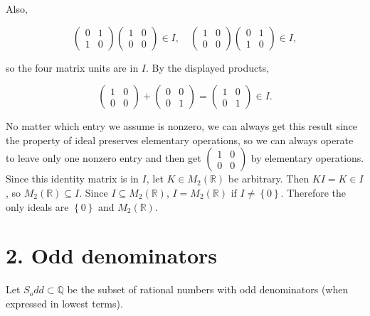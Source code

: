 Also,

\[\begin{pmatrix}
0 & 1 \\
1 & 0
\end{pmatrix}\begin{pmatrix}
1 & 0 \\
0 & 0
\end{pmatrix} \in I,\quad\begin{pmatrix}
1 & 0 \\
0 & 0
\end{pmatrix}\begin{pmatrix}
0 & 1 \\
1 & 0
\end{pmatrix} \in I,\]

so the four matrix units are in \(I\). By the displayed products,

\[\begin{pmatrix}
1 & 0 \\
0 & 0
\end{pmatrix} + \begin{pmatrix}
0 & 0 \\
0 & 1
\end{pmatrix} = \begin{pmatrix}
1 & 0 \\
0 & 1
\end{pmatrix} \in I.\]

No matter which entry we assume is nonzero, we can always get this result since the property of ideal preserves elementary operations, so we can always operate to leave only one nonzero entry and then get \(\begin{pmatrix}
1 & 0 \\
0 & 0
\end{pmatrix}\) by elementary operations. Since this identity matrix is in \(I\), let \(K \in M_{2}\left( \mathbb{R} \right)\) be arbitrary. Then \(KI = K \in I\), so \(M_{2}\left( \mathbb{R} \right) \subseteq I\). Since \(I \subseteq M_{2}\left( \mathbb{R} \right)\), \(I = M_{2}\left( \mathbb{R} \right)\) if \(I \neq \left\{ 0 \right\}\). Therefore the only ideals are \(\left\{ 0 \right\}\) and \(M_{2}\left( \mathbb{R} \right)\).

\section{2. Odd denominators}

Let \(S_{o}dd \subset \mathbb{Q}\) be the subset of rational numbers with odd denominators (when expressed in lowest terms).

